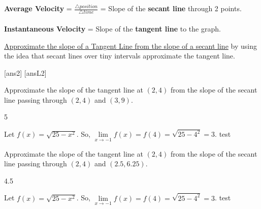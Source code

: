 \begin{tcolorbox}[title = {Average Velocity (Rate of Change) vs.  Instantaneous Velocity (Rate of Change)}]
\textbf{Average Velocity} = $\frac{\triangle position}{\triangle time}$ = Slope of the \textbf{secant line} through 2 points.\\\\
\textbf{Instantaneous Velocity} = Slope of the \textbf{tangent line} to the graph.
\end{tcolorbox}

\noindent \underline{Approximate the slope of a Tangent Line from the slope of a secant line} by using the idea that secant lines over tiny intervals approximate the tangent line. 

[ans2]
[ansL2]
\begin{example}\label{approxTangent1}
Approximate the slope of the tangent line at $(2,4)$ from the slope of the secant line passing through $(2,4)$ and $(3,9)$.\\
    \begin{sol}
    5
    \end{sol}
    \begin{solL}
    Let \(f(x)=\sqrt{25-x^2}\). So, $\lim\limits_{x \to -1} f(x)=f(4)=\sqrt{25-4^2}=3$. test
    
    \end{solL}
\end{example}
\vspace{1in}

\begin{example}\label{approxTangent2}
Approximate the slope of the tangent line at $(2,4)$ from the slope of the secant line passing through $(2,4)$ and $(2.5,6.25)$.\\
    \begin{sol}
    4.5
    \end{sol}
    \begin{solL}
    Let \(f(x)=\sqrt{25-x^2}\). So, $\lim\limits_{x \to -1} f(x)=f(4)=\sqrt{25-4^2}=3$. test
    
    \end{solL}
\end{example}
\vspace{1in}

